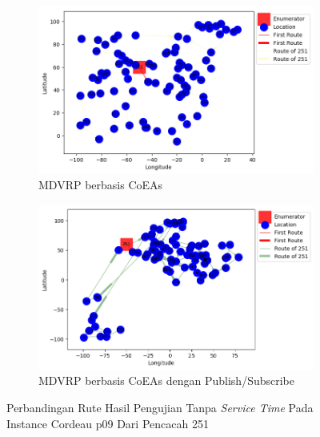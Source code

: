 \begin{figure}[H]
	\centering
	\begin{subfigure}[t]{\textwidth}
		\centering
		\includegraphics[width=\textwidth]{Resources/Images/cordeau_p09/cordeau_p09_notw_251_coes}
		\caption{MDVRP berbasis CoEAs}
		\label{fig:cordeau_p09_notw_251_coes}
	\end{subfigure}
	\begin{subfigure}[t]{\textwidth}
		\centering
		\includegraphics[width=\textwidth]{Resources/Images/cordeau_p09/cordeau_p09_notw_251_pubsub_coes}
		\caption{MDVRP berbasis CoEAs dengan Publish/Subscribe}
		\label{fig:cordeau_p09_notw_251_pubsub_coes}
	\end{subfigure}
	\caption{Perbandingan Rute Hasil Pengujian Tanpa \textit{Service Time} Pada Instance Cordeau p09 Dari Pencacah 251}
	\label{fig:cordeau_p09_notw_251}
\end{figure}


